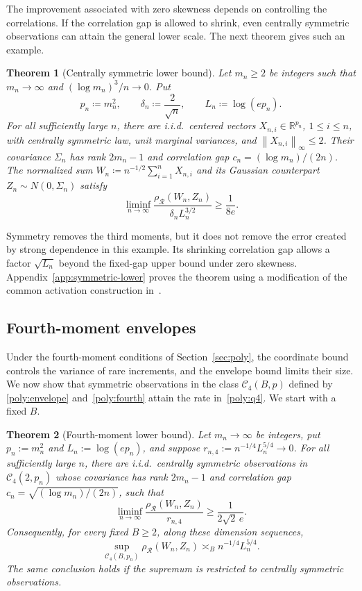\documentclass[11pt,letterpaper]{article}
\newtheorem{theorem}{Theorem}
\theoremstyle{remark}
\newcommand{\R}{\mathbb R}
\newcommand{\norm}[1]{\left\lVert#1\right\rVert}
\newcommand{\rh}{\rho_{\mathcal R}}
\begin{document}
The improvement associated with zero skewness depends on controlling
the correlations. If the correlation gap is allowed to shrink, even
centrally symmetric observations can attain the general lower scale.
The next theorem gives such an example.
\begin{theorem}[Centrally symmetric lower bound]\label{opt:symmetric-lower}
Let \(m_n\ge2\) be integers such that \(m_n\to\infty\) and
\((\log m_n)^3/n\to0\). Put
\[
 p_n\coloneqq m_n^2,\qquad \delta_n\coloneqq\frac2{\sqrt n},
 \qquad L_n\coloneqq\log(ep_n).
\]
For all sufficiently large \(n\), there are i.i.d.\ centered vectors
\(X_{n,i}\in\R^{p_n}\), \(1\le i\le n\), with centrally symmetric
law, unit marginal variances, and \(\norm{X_{n,i}}_\infty\le2\).
Their covariance \(\Sigma_n\) has rank \(2m_n-1\) and correlation
gap \(c_n=(\log m_n)/(2n)\). The normalized sum
\(W_n\coloneqq n^{-1/2}\sum_{i=1}^nX_{n,i}\) and its Gaussian
counterpart \(Z_n\sim N(0,\Sigma_n)\) satisfy
\[
 \liminf_{n\to\infty}
 \frac{\rh(W_n,Z_n)}{\delta_nL_n^{3/2}}\ge\frac1{8e}.
\]
\end{theorem}

Symmetry removes the third moments, but it does not remove the error
created by strong dependence in this example. Its shrinking correlation
gap allows a factor \(\sqrt{L_n}\) beyond the fixed-gap upper bound
under zero skewness.
Appendix~\ref{app:symmetric-lower} proves the theorem using a
modification of the common activation construction
in~\cite[Proposition~E.1]{FKLZ}.

\subsection{Fourth-moment envelopes}\label{opt:q4-comparison}

Under the fourth-moment conditions of Section~\ref{sec:poly}, the
coordinate bound controls the variance of rare increments, and the
envelope bound limits their size. We now show that symmetric observations in the class
\(\mathcal C_4(B,p)\) defined by
\eqref{poly:envelope} and~\eqref{poly:fourth} attain the rate
in~\eqref{poly:q4}. We start with a fixed \(B\).

\begin{theorem}[Fourth-moment lower bound]\label{opt:q4-lower}
Let \(m_n\to\infty\) be integers, put \(p_n:=m_n^2\) and
\(L_n:=\log(ep_n)\), and suppose
\(r_{n,4}:=n^{-1/4}L_n^{5/4}\to0\).
For all sufficiently large \(n\), there are i.i.d.\ centrally
symmetric observations in \(\mathcal C_4(2,p_n)\) whose covariance
has rank \(2m_n-1\) and correlation gap
\(c_n=\sqrt{(\log m_n)/(2n)}\), such that
\begin{equation}
 \liminf_{n\to\infty}
 \frac{\rh(W_n,Z_n)}{r_{n,4}}\ge\frac1{2\sqrt2\,e}.
 \label{opt:eq:q4-lower}
\end{equation}
Consequently, for every fixed \(B\ge2\), along these dimension sequences,
\begin{equation}
 \sup_{\mathcal C_4(B,p_n)}\rh(W_n,Z_n)
 \asymp_B n^{-1/4}L_n^{5/4}.
 \label{lower:q4-fixed}
\end{equation}
The same conclusion holds if the supremum is restricted to centrally
symmetric observations.
\end{theorem}
\end{document}
